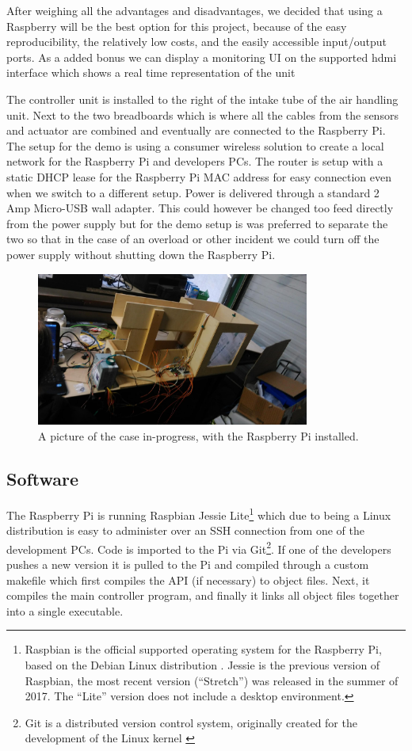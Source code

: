 \documentclass[a4paper,oneside]{book}
\begin{document}
After weighing all the advantages and disadvantages, we decided that using a
Raspberry will be the best option for this project, because of the easy
reproducibility, the relatively low  costs, and the easily accessible
input/output ports. As a added bonus we can display a monitoring UI on the
supported hdmi interface which shows a real time representation of the unit

The controller unit is installed to the right of the intake tube of the air
handling unit. Next to the two breadboards which is where all the cables from
the sensors and actuator are combined and eventually are connected to the
Raspberry Pi. The setup for the demo is using a consumer wireless solution to
create a local network for the Raspberry Pi and developers PCs. The router is
setup with a static DHCP lease for the Raspberry Pi MAC address for easy
connection even when we switch to a different setup. Power is delivered through
a standard 2 Amp Micro-USB wall adapter. This could however be changed too feed
directly from the power supply but for the demo setup is was preferred to
separate the two so that in the case of an overload or other incident we could
turn off the power supply without shutting down the Raspberry Pi.

\begin{figure}[h]
\centering
\includegraphics[width=0.8\textwidth]{images/casebuilt.jpg}
\caption{A picture of the case in-progress, with the Raspberry Pi installed.}
\label{fig:case}
\end{figure}

\subsection{Software}
The Raspberry Pi is running Raspbian Jessie Lite\footnote{Raspbian
\cite{Raspbian} is the official supported operating system for the Raspberry
Pi, based on the Debian Linux distribution \cite{Debian}. Jessie is the
previous version of Raspbian, the most recent version (``Stretch'') was
released in the summer of 2017. The ``Lite'' version does not include a desktop
environment.} which due to being a Linux distribution is easy to administer
over an SSH connection from one of the development PCs. Code is imported to
the Pi via Git\footnote{Git is a distributed version control system, originally
created for the development of the Linux kernel \cite{Git}}. If one of the
developers pushes a new version it is pulled to the Pi and compiled through a
custom makefile which first compiles the API (if necessary) to object files.
Next, it compiles the main controller program, and finally it links all object
files together into a single executable.
\end{document}

